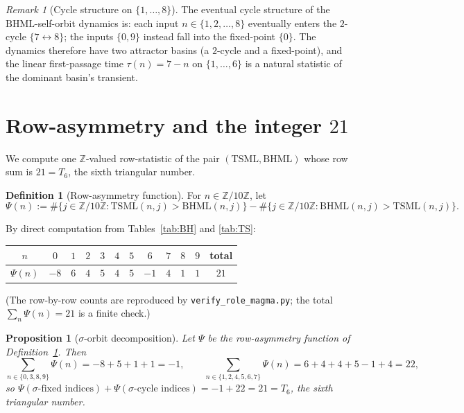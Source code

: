 \documentclass[11pt,reqno]{amsart}
\theoremstyle{plain}
\newtheorem{proposition}[theorem]{Proposition}
\theoremstyle{definition}
\newtheorem{definition}[theorem]{Definition}
\theoremstyle{remark}
\newtheorem*{remark}{Remark}
\newcommand{\Z}{\mathbb{Z}}
\newcommand{\TS}{\mathrm{TSML}}
\newcommand{\BH}{\mathrm{BHML}}
\newcommand{\sig}{\sigma}
\newcommand{\Zten}{\Z/10\Z}
\begin{document}
\begin{remark}[Cycle structure on $\{1, \ldots, 8\}$]
\label{rem:cycle-78}
The eventual cycle structure of the $\BH$-self-orbit dynamics is:
each input $n \in \{1, 2, \ldots, 8\}$ eventually enters the
$2$-cycle $\{7 \leftrightarrow 8\}$; the inputs $\{0, 9\}$
instead fall into the fixed-point $\{0\}$. The dynamics
therefore have two attractor basins (a $2$-cycle and a
fixed-point), and the linear first-passage time
$\tau(n) = 7 - n$ on $\{1, \ldots, 6\}$ is a natural statistic
of the dominant basin's transient.
\end{remark}

\section{Row-asymmetry and the integer $21$}
\label{sec:row-asymmetry}

We compute one $\Z$-valued row-statistic of the pair $(\TS, \BH)$
whose row sum is $21 = T_6$, the sixth triangular number.

\begin{definition}[Row-asymmetry function]\label{def:row-asym}
For $n \in \Zten$, let
\[
  \Psi(n) := \#\{j \in \Zten : \TS(n, j) > \BH(n, j)\}
            - \#\{j \in \Zten : \BH(n, j) > \TS(n, j)\}.
\]
\end{definition}

By direct computation from Tables~\ref{tab:BH} and \ref{tab:TS}:
\begin{center}
\begin{tabular}{c|cccccccccc|c}
$n$ & $0$ & $1$ & $2$ & $3$ & $4$ & $5$ & $6$ & $7$ & $8$ & $9$ & total \\ \hline
$\Psi(n)$ & $-8$ & $6$ & $4$ & $5$ & $4$ & $5$ & $-1$ & $4$ & $1$ & $1$ & $21$ \\
\end{tabular}
\end{center}

(The row-by-row counts are reproduced by
\texttt{verify\_role\_magma.py}; the total $\sum_n \Psi(n) = 21$
is a finite check.)

\begin{proposition}[$\sig$-orbit decomposition]
\label{prop:triangular}
Let $\Psi$ be the row-asymmetry function of
Definition~\ref{def:row-asym}. Then
\[
  \sum_{n \in \{0,3,8,9\}} \Psi(n)
  = -8 + 5 + 1 + 1 = -1,
  \qquad
  \sum_{n \in \{1, 2, 4, 5, 6, 7\}} \Psi(n)
  = 6 + 4 + 4 + 5 - 1 + 4 = 22,
\]
so $\Psi(\text{$\sig$-fixed indices}) + \Psi(\text{$\sig$-cycle
indices}) = -1 + 22 = 21 = T_6$, the sixth triangular number.
\end{proposition}
\end{document}
